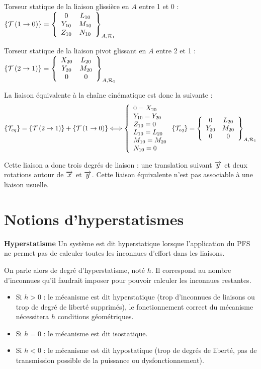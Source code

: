 \documentclass[10pt]{article}
\begin{document}
Torseur statique de la liaison glissière en $A$ entre 1 et 0 : 
$\torseurstat{T}{1}{0}=\torseurcol{0}{Y_{10}}{Z_{10}}{L_{10}}{M_{10}}{N_{10}}{A,\mathcal{R}_1}$

Torseur statique de la liaison pivot glissant en $A$ entre 2 et 1 :
$\torseurstat{T}{2}{1}=\torseurcol{X_{20}}{Y_{20}}{0}{L_{20}}{M_{20}}{0}{A,\mathcal{R}_1}
$

La liaison équivalente à la chaîne cinématique est donc la suivante : 
$$
\{\mathcal{T}_{eq}\}=\torseurstat{T}{2}{1}+\torseurstat{T}{1}{0}
\Longleftrightarrow
\left\{
\begin{array}{l}
0=X_{20}\\
Y_{10}=Y_{20}\\
Z_{10}=0\\
L_{10}=L_{20}\\
M_{10}=M_{20}\\
N_{10}=0
\end{array}
\right.
\{\mathcal{T}_{eq}\}=
\torseurcol{0}{Y_{20}}{0}{L_{20}}{M_{20}}{0}{A,\mathcal{R}_1}
$$

Cette liaison a donc trois degrés de liaison : une translation suivant $\vect{y}$ et deux rotations autour de $\vect{x}$ et $\vect{y}$. Cette liaison équivalente n'est pas associable à une liaison usuelle. 


\section{Notions d'hyperstatismes}

\begin{defi}
\textbf{Hyperstatisme}
Un système est dit hyperstatique lorsque l'application du PFS ne permet pas de calculer toutes les inconnues d'effort dans les liaisons. 

On parle alors de degré d'hyperstatisme, noté $h$. Il correspond au nombre d'inconnues qu'il faudrait imposer pour pouvoir calculer les inconnues restantes. 

\begin{itemize}
\item Si $h>0$ : le mécanisme est dit hyperstatique (trop d'inconnues de liaisons ou trop de degré de liberté supprimés), le fonctionnement correct du mécanisme nécessitera $h$ conditions géométriques.
\item Si $h=0$ : le mécanisme est dit isostatique. 
\item Si $h<0$ : le mécanisme est dit hypostatique (trop de degrés de liberté, pas de transmission possible de la puissance ou dysfonctionnement).
\end{itemize}

\end{defi}
\end{document}
